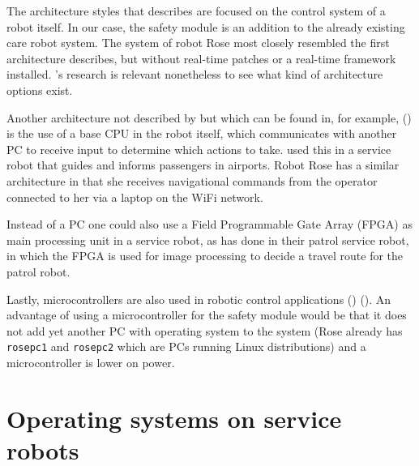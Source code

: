 \documentclass[12pt]{scrreprt}
\begin{document}
\par
The architecture styles that \citeauthor{bouchier} describes are focused on the control system of a robot itself. In our case, the safety module is an addition to the already existing care robot system. The system of robot Rose most closely resembled the first architecture \citeauthor{bouchier} describes, but without real-time patches or a real-time framework installed. \citeauthor{bouchier}'s research is relevant nonetheless to see what kind of architecture options exist.
\par
Another architecture not described by \citeauthor{bouchier} but which can be found in, for example, (\cite{spencer}) is the use of a base CPU in the robot itself, which communicates with another PC to receive input to determine which actions to take. \citeauthor{spencer} used this in a service robot that guides and informs passengers in airports. Robot Rose has a similar architecture in that she receives navigational commands from the operator connected to her via a laptop on the WiFi network. 
\par
Instead of a PC one could also use a Field Programmable Gate Array (FPGA) as main processing unit in a service robot, as \citeauthor{visual_xenomai} has done in their patrol service robot, in which the FPGA is used for image processing to decide a travel route for the patrol robot. 
\par
Lastly, microcontrollers are also used in robotic control applications (\cite{microcontroller1}) (\cite{microcontroller2}). An advantage of using a microcontroller for the safety module would be that it does not add yet another PC with operating system to the system (Rose already has \texttt{rosepc1} and \texttt{rosepc2} which are PCs running Linux distributions) and a microcontroller is lower on power.

\section{Operating systems on service robots}
\label{tOS}
\end{document}
